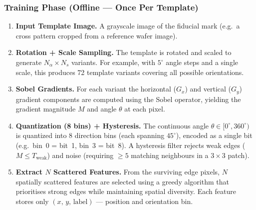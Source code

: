 \documentclass[12pt,a4paper]{article}
\begin{document}
\subsubsection{Training Phase (Offline --- Once Per Template)}
\begin{enumerate}
  \item \textbf{Input Template Image.}  A grayscale image of the fiducial mark
        (e.g.\ a cross pattern cropped from a reference wafer image).

  \item \textbf{Rotation + Scale Sampling.}  The template is rotated and scaled to
        generate $N_\alpha \times N_s$ variants.  For example, with $5^\circ$ angle
        steps and a single scale, this produces 72 template variants covering all
        possible orientations.

  \item \textbf{Sobel Gradients.}  For each variant the horizontal ($G_x$) and
        vertical ($G_y$) gradient components are computed using the Sobel operator,
        yielding the gradient magnitude $M$ and angle $\theta$ at each pixel.

  \item \textbf{Quantization (8 bins) + Hysteresis.}  The continuous angle
        $\theta \in [0^\circ, 360^\circ)$ is quantized into 8 direction bins (each
        spanning $45^\circ$), encoded as a single bit (e.g.\ bin~0 = bit~1,
        bin~3 = bit~8).  A hysteresis filter rejects weak edges
        ($M \leq T_\text{weak}$) and noise (requiring $\geq 5$ matching neighbours
        in a $3\times 3$ patch).

  \item \textbf{Extract $N$ Scattered Features.}  From the surviving edge pixels,
        $N$ spatially scattered features are selected using a greedy algorithm that
        prioritises strong edges while maintaining spatial diversity.  Each feature
        stores only $(x,\,y,\,\text{label})$ --- position and orientation bin.
\end{enumerate}
\end{document}
